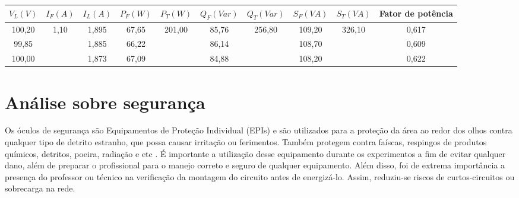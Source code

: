 \documentclass[a4paper,12pt,oneside,openany,table,xcdraw]{article}
\begin{document}
\begin{table}[H]\scriptsize
\centering
\def\arraystretch{1.35}
\captionsetup{font=scriptsize}
 \label{tab6}

\begin{tabular}{|c|c|c|c|c|c|c|c|c|c|}
\hline
$V_{L} (V)$ & $I_{F} (A)$           & $I_{L} (A)$ & $P_{F} (W)$ & $P_{T} (W)$             & $Q_{F} (Var)$ & $Q_{T} (Var)$           & $S_{F} (VA)$ & $S_{T} (VA)$            & Fator de potência \\ \hline
100,20      & \multirow{3}{*}{1,10} & 1,895       & 67,65       & \multirow{3}{*}{201,00} & 85,76         & \multirow{3}{*}{256,80} & 109,20       & \multirow{3}{*}{326,10} & 0,617             \\ \cline{1-1} \cline{3-4} \cline{6-6} \cline{8-8} \cline{10-10} 
99,85       &                       & 1,885       & 66,22       &                         & 86,14         &                         & 108,70       &                         & 0,609             \\ \cline{1-1} \cline{3-4} \cline{6-6} \cline{8-8} \cline{10-10} 
100,00      &                       & 1,873       & 67,09       &                         & 84,88         &                         & 108,20       &                         & 0,622             \\ \hline
\end{tabular}
\end{table}

\section{Análise sobre segurança} %
Os óculos de segurança são Equipamentos de Proteção Individual (EPIs) e são utilizados para a proteção da área ao redor dos olhos contra qualquer tipo de detrito estranho, que possa causar irritação ou ferimentos. Também protegem contra faíscas, respingos de produtos químicos, detritos, poeira, radiação e etc \cite{safe}.
É importante a utilização desse equipamento durante os experimentos a fim de evitar qualquer dano, além de preparar o profissional para o manejo correto e seguro de qualquer equipamento.
Além disso, foi de extrema importância a presença do professor ou técnico na verificação da montagem do circuito antes de energizá-lo. Assim, reduziu-se riscos de curtos-circuitos ou sobrecarga na rede.
\end{document}
